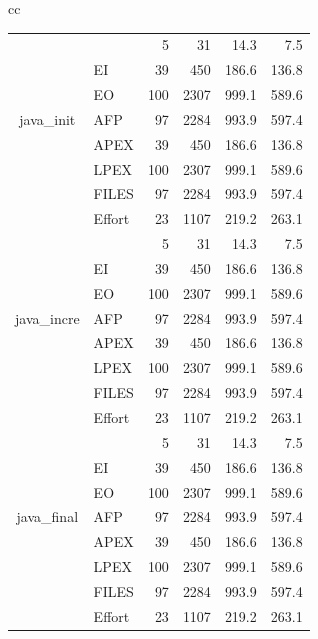 \documentclass[sigconf,review,anonymous]{acmart}
\begin{document}
\begin{table}[t!]
{\begin{tabular}{cc}
\begin{tabular}{|c|l|rrrr|}
\multirow{7}{*}{\begin{sideways}java\_init\end{sideways}}
& \IT{LOC} & 5 & 31 & 14.3 & 7.5\\
& EI & 39 & 450 & 186.6 & 136.8\\
& EO & 100 & 2307 & 999.1 & 589.6\\
& AFP & 97 & 2284 & 993.9 & 597.4\\
& APEX & 39 & 450 & 186.6 & 136.8\\
& LPEX & 100 & 2307 & 999.1 & 589.6\\
& FILES & 97 & 2284 & 993.9 & 597.4\\
& Effort & 23 & 1107 & 219.2 & 263.1\\
\hline
\multirow{7}{*}{\begin{sideways}java\_incre\end{sideways}}
& \IT{LOC} & 5 & 31 & 14.3 & 7.5\\
& EI & 39 & 450 & 186.6 & 136.8\\
& EO & 100 & 2307 & 999.1 & 589.6\\
& AFP & 97 & 2284 & 993.9 & 597.4\\
& APEX & 39 & 450 & 186.6 & 136.8\\
& LPEX & 100 & 2307 & 999.1 & 589.6\\
& FILES & 97 & 2284 & 993.9 & 597.4\\
& Effort & 23 & 1107 & 219.2 & 263.1\\
\hline
\multirow{7}{*}{\begin{sideways}java\_final\end{sideways}}
& \IT{LOC} & 5 & 31 & 14.3 & 7.5\\
& EI & 39 & 450 & 186.6 & 136.8\\
& EO & 100 & 2307 & 999.1 & 589.6\\
& AFP & 97 & 2284 & 993.9 & 597.4\\
& APEX & 39 & 450 & 186.6 & 136.8\\
& LPEX & 100 & 2307 & 999.1 & 589.6\\
& FILES & 97 & 2284 & 993.9 & 597.4\\
& Effort & 23 & 1107 & 219.2 & 263.1\\
\hline
\end{tabular} 


~


\end{tabular}}
\end{table}
\end{document}
